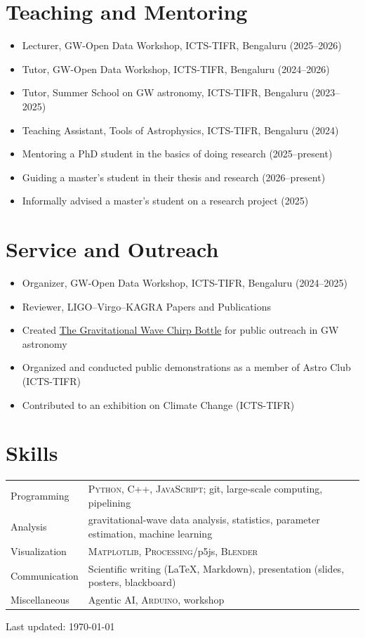 \documentclass[a4paper,11pt]{article}
\begin{document}
\section{Teaching and Mentoring}
\begin{itemize}[nosep,after=\strut,leftmargin=1em,itemsep=3pt]
\item[--] Lecturer, GW-Open Data Workshop, ICTS-TIFR, Bengaluru (2025--2026)
\item[--] Tutor, GW-Open Data Workshop, ICTS-TIFR, Bengaluru (2024--2026)
\item[--] Tutor, Summer School on GW astronomy, ICTS-TIFR, Bengaluru (2023--2025)
\item[--] Teaching Assistant, Tools of Astrophysics, ICTS-TIFR, Bengaluru (2024)
\item[--] Mentoring a PhD student in the basics of doing research (2025--present)
\item[--] Guiding a master's student in their thesis and research (2026--present)
\item[--] Informally advised a master's student on a research project (2025)
\end{itemize}

\section{Service and Outreach}
\begin{itemize}[nosep,after=\strut,leftmargin=1em,itemsep=3pt]
\item[--] Organizer, GW-Open Data Workshop, ICTS-TIFR, Bengaluru (2024--2025)
\item[--] Reviewer, LIGO--Virgo--KAGRA Papers and Publications
\item[--] Created \href{https://github.com/anbarsode/GW_jug/blob/main/poster.jpg}{The Gravitational Wave Chirp Bottle} for public outreach in GW astronomy %
\item[--] Organized and conducted public demonstrations as a member of Astro Club (ICTS-TIFR)
\item[--] Contributed to an exhibition on Climate Change (ICTS-TIFR)
\end{itemize}

\section{Skills}
\begin{tabularx}{\linewidth}{@{}l X@{}}
Programming & \normalsize{\textsc{Python}, \textsc{C++}, \textsc{JavaScript}; git, large-scale computing, pipelining}\\
Analysis & \normalsize{gravitational-wave data analysis, statistics, parameter estimation, machine learning}\\
Visualization & \normalsize{\textsc{Matplotlib}, \textsc{Processing}/p5js, \textsc{Blender}}\\
Communication & \normalsize{Scientific writing (\LaTeX, Markdown), presentation (slides, posters, blackboard)}\\
Miscellaneous & \normalsize{Agentic AI, \textsc{Arduino}, workshop}
\end{tabularx}

\vfill
\begin{center}
\footnotesize Last updated: \today
\end{center}
\end{document}
